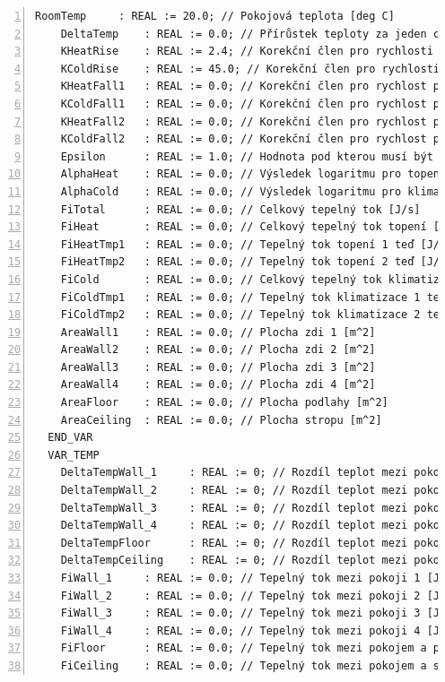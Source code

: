 \begin{lstlisting}[language=ST, breaklines=true, numbers=left, numberstyle=\small, numbersep=10pt, frame=single, basicstyle=\ttfamily\small, caption={Definice funkčního bloku fbRoomTempMod}, label={lst:fbRoomTempMod}]
    RoomTemp     : REAL := 20.0; // Pokojová teplota [deg C]
    DeltaTemp    : REAL := 0.0; // Přírůstek teploty za jeden cyklus [deg C]
    KHeatRise    : REAL := 2.4; // Korekční člen pro rychlosti náběhu topení 1 [-]
    KColdRise    : REAL := 45.0; // Korekční člen pro rychlosti náběhu klimatizace 1 [-]
    KHeatFall1   : REAL := 0.0; // Korekční člen pro rychlost poklesu topení 1 [-]
    KColdFall1   : REAL := 0.0; // Korekční člen pro rychlost poklesu klimatizace 1 [-]
    KHeatFall2   : REAL := 0.0; // Korekční člen pro rychlost poklesu topení 2 [-]
    KColdFall2   : REAL := 0.0; // Korekční člen pro rychlost poklesu klimatizace 2 [-]
    Epsilon      : REAL := 1.0; // Hodnota pod kterou musí být výkon do stanoveného času [-]
    AlphaHeat    : REAL := 0.0; // Výsledek logaritmu pro topení [-]
    AlphaCold    : REAL := 0.0; // Výsledek logaritmu pro klimatizace [-]
    FiTotal      : REAL := 0.0; // Celkový tepelný tok [J/s]
    FiHeat       : REAL := 0.0; // Celkový tepelný tok topení [J/s]
    FiHeatTmp1   : REAL := 0.0; // Tepelný tok topení 1 teď [J/s]
    FiHeatTmp2   : REAL := 0.0; // Tepelný tok topení 2 teď [J/s]
    FiCold       : REAL := 0.0; // Celkový tepelný tok klimatizace [J/s]
    FiColdTmp1   : REAL := 0.0; // Tepelný tok klimatizace 1 teď [J/s]
    FiColdTmp2   : REAL := 0.0; // Tepelný tok klimatizace 2 teď [J/s]
    AreaWall1    : REAL := 0.0; // Plocha zdi 1 [m^2]
    AreaWall2    : REAL := 0.0; // Plocha zdi 2 [m^2]
    AreaWall3    : REAL := 0.0; // Plocha zdi 3 [m^2]
    AreaWall4    : REAL := 0.0; // Plocha zdi 4 [m^2]
    AreaFloor    : REAL := 0.0; // Plocha podlahy [m^2]
    AreaCeiling  : REAL := 0.0; // Plocha stropu [m^2]
  END_VAR
  VAR_TEMP
    DeltaTempWall_1     : REAL := 0; // Rozdíl teplot mezi pokoji 1 [deg C]
    DeltaTempWall_2     : REAL := 0; // Rozdíl teplot mezi pokoji 2 [deg C]
    DeltaTempWall_3     : REAL := 0; // Rozdíl teplot mezi pokoji 3 [deg C]
    DeltaTempWall_4     : REAL := 0; // Rozdíl teplot mezi pokoji 4 [deg C]
    DeltaTempFloor      : REAL := 0; // Rozdíl teplot mezi pokojem a podlahou [deg C]
    DeltaTempCeiling    : REAL := 0; // Rozdíl teplot mezi pokojem a stropem [deg C]
    FiWall_1     : REAL := 0.0; // Tepelný tok mezi pokoji 1 [J/s]
    FiWall_2     : REAL := 0.0; // Tepelný tok mezi pokoji 2 [J/s]
    FiWall_3     : REAL := 0.0; // Tepelný tok mezi pokoji 3 [J/s]
    FiWall_4     : REAL := 0.0; // Tepelný tok mezi pokoji 4 [J/s]
    FiFloor      : REAL := 0.0; // Tepelný tok mezi pokojem a podlahou [J/s]
    FiCeiling    : REAL := 0.0; // Tepelný tok mezi pokojem a stropem [J/s]

\end{lstlisting}

